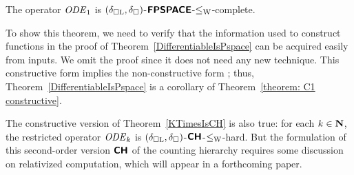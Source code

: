 \begin{theorem}
\label{theorem: C1 constructive}
The operator $\mathit{ODE} _1$ is $(\delta _{\square \mathrm L}, \delta _\square)$-$\text{\bfseries \sffamily \upshape FPSPACE}$-$\leq _{\mathrm W}$-complete.
\end{theorem}

To show this theorem,
we need to verify that the information used to construct functions in the proof of Theorem~\ref{DifferentiableIsPspace}
can be acquired easily from inputs.
We omit the proof since it does not need any new technique.
This constructive form implies the non-constructive form \cite[Lemma 3.7 and 3.8]{kawamura2010operators}; 
thus, Theorem~\ref{DifferentiableIsPspace} is a corollary of 
Theorem~\ref{theorem: C1 constructive}.

The constructive version of Theorem~\ref{KTimesIsCH} is also true: 
for each $k \in \mathbf N$,
the restricted operator $\mathit{ODE} _k$ is 
$(\delta _{\square \mathrm L}, \delta _\square)$-$\text{\bfseries \sffamily \upshape CH}$-$\leq _{\mathrm W}$-hard.
But the formulation of this 
second-order version $\text{\bfseries \sffamily \upshape CH}$ of the counting hierarchy 
requires some discussion on relativized computation, 
which will appear in a forthcoming paper. 
